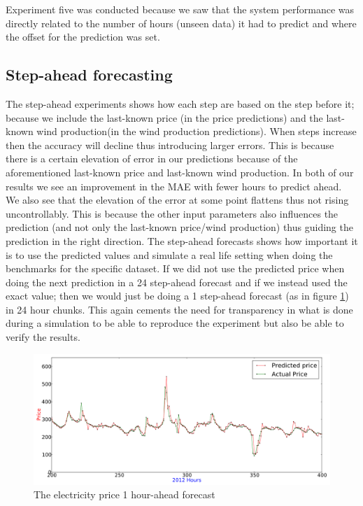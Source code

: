 Experiment five was conducted because we saw that the system performance was directly related to the number of hours (unseen data) it had to predict and where the offset for the prediction was set.
\subsection{Step-ahead forecasting}
\label{sec:stepAheadDiscussion}
The step-ahead experiments shows how each step are based on the step before it; because we include the last-known price (in the price predictions) and the last-known wind production(in the wind production predictions). When steps increase then the accuracy will decline thus introducing larger errors. This is because there is a certain elevation of error in our predictions because of the aforementioned last-known price and last-known wind production. In both of our results we see an improvement in the MAE with fewer hours to predict ahead. We also see that the elevation of the error at some point flattens thus not rising uncontrollably. This is because the other input parameters also influences the prediction (and not only the last-known price/wind production) thus guiding the prediction in the right direction. The step-ahead forecasts shows how important it is to use the predicted values and simulate a real life setting when doing the benchmarks for the specific dataset. If we did not use the predicted price when doing the next prediction in a 24 step-ahead forecast and if we instead used the exact value; then we would just be doing a 1 step-ahead forecast (as in figure \ref{fig:1HourAheadPrice_Discussion}) in 24 hour chunks. This again cements the need for transparency in what is done during a simulation to be able to reproduce the experiment but also be able to verify the results.

\begin{figure}[H]
\centering
\includegraphics[width=0.99\linewidth]{billeder/Discussion/1HourAhead_Price.png}
\caption{The electricity price 1 hour-ahead forecast}
\label{fig:1HourAheadPrice_Discussion}
\end{figure}

